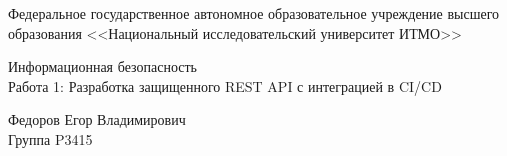 \begin{titlepage}
	\thispagestyle{firststyle}
	\begin{center}
		Федеральное государственное автономное
		образовательное учреждение высшего образования <<Национальный
		исследовательский университет ИТМО>>
	\end{center}

	\vspace{1cm}

	\begin{center}
		\large
		Информационная безопасность\\
		Работа 1: Разработка защищенного REST API с интеграцией в CI/CD
	\end{center}

	\vspace{2cm}

	\begin{flushright}
		Федоров Егор Владимирович \\
		Группа P3415
	\end{flushright}

\end{titlepage}
